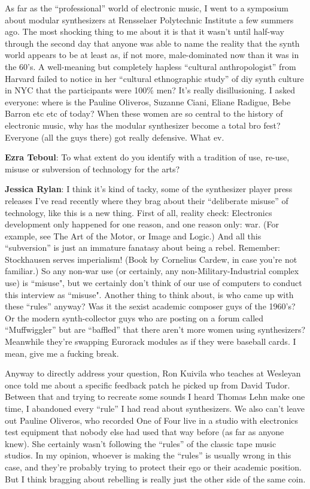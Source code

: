 As far as the ``professional'' world of electronic music, I went to a symposium about modular synthesizers at Rensselaer Polytechnic Institute a few summers ago. The most shocking thing to me about it is that it wasn't until half-way through the second day that anyone was able to name the reality that the synth world appears to be at least as, if not more, male-dominated now than it was in the 60's. A well-meaning but completely hapless ``cultural anthropologist'' from Harvard failed to notice in her ``cultural ethnographic study'' of diy synth culture in NYC that the participants were 100\% men? It's really disillusioning. I asked everyone: where is the Pauline Oliveros, Suzanne Ciani, Eliane Radigue, Bebe Barron etc etc of today? When these women are so central to the history of electronic music, why has the modular synthesizer become a total bro fest? Everyone (all the guys there) got really defensive. What ev.

\textbf{Ezra Teboul}: To what extent do you identify with a tradition of use, re-use, misuse or subversion of technology for the arts? 
                  
\textbf{Jessica Rylan}: I think it's kind of tacky, some of the synthesizer player press releases I've read recently where they brag about their ``deliberate misuse'' of technology, like this is a new thing. First of all, reality check: Electronics development only happened for one reason, and one reason only: war. (For example, see The Art of the Motor, or Image and Logic.) And all this ``subversion'' is just an immature fanatasy about being a rebel. Remember: Stockhausen serves imperialism! (Book by Cornelius Cardew, in case you're not familiar.) So any non-war use (or certainly, any non-Military-Industrial complex use) is ``misuse", but we certainly don't think of our use of computers to conduct this interview as ``misuse". Another thing to think about, is who came up with these ``rules'' anyway? Was it the sexist academic composer guys of the 1960's? Or the modern synth-collector guys who are posting on a forum called ``Muffwiggler'' but are ``baffled'' that there aren't more women using synthesizers? Meanwhile they're swapping Eurorack modules as if they were baseball cards. I mean, give me a fucking break.

Anyway to directly address your question, Ron Kuivila who teaches at Wesleyan once told me about a specific feedback patch he picked up from David Tudor. Between that and trying to recreate some sounds I heard Thomas Lehn make one time, I abandoned every ``rule'' I had read about synthesizers. We also can't leave out Pauline Oliveros, who recorded One of Four live in a studio with electronics test equipment that nobody else had used that way before (as far as anyone knew). She certainly wasn't following the ``rules'' of the classic tape music studios. In my opinion, whoever is making the ``rules'' is usually wrong in this case, and they're probably trying to protect their ego or their academic position. But I think bragging about rebelling is really just the other side of the same coin. 
 
